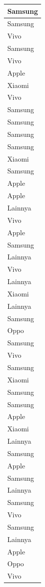 \documentclass[
  letterpaper,
  DIV=11,
  numbers=noendperiod]{scrartcl}
\begin{document}
\begin{table}
\begin{tabular}[t]{l}
\hline
Samsung\\
\hline
Samsung\\
\hline
Vivo\\
\hline
Samsung\\
\hline
Vivo\\
\hline
Apple\\
\hline
Xiaomi\\
\hline
Vivo\\
\hline
Samsung\\
\hline
Samsung\\
\hline
Samsung\\
\hline
Samsung\\
\hline
Xiaomi\\
\hline
Samsung\\
\hline
Apple\\
\hline
Apple\\
\hline
Lainnya\\
\hline
Vivo\\
\hline
Apple\\
\hline
Samsung\\
\hline
Lainnya\\
\hline
Vivo\\
\hline
Lainnya\\
\hline
Xiaomi\\
\hline
Lainnya\\
\hline
Samsung\\
\hline
Oppo\\
\hline
Samsung\\
\hline
Vivo\\
\hline
Samsung\\
\hline
Xiaomi\\
\hline
Samsung\\
\hline
Samsung\\
\hline
Apple\\
\hline
Xiaomi\\
\hline
Lainnya\\
\hline
Samsung\\
\hline
Apple\\
\hline
Samsung\\
\hline
Lainnya\\
\hline
Samsung\\
\hline
Vivo\\
\hline
Samsung\\
\hline
Lainnya\\
\hline
Apple\\
\hline
Oppo\\
\hline
Vivo\\

\end{tabular}
\end{table}
\end{document}
